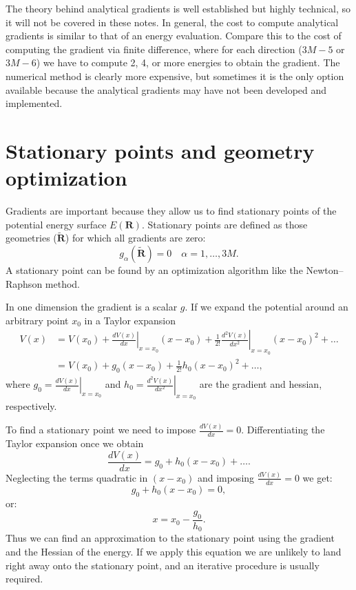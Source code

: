 \documentclass[../Main/chem532-notes.tex]{subfiles}
\begin{document}
The theory behind analytical gradients is well established but highly technical, so it will not be covered in these notes. In general, the cost to compute analytical gradients is similar to that of an energy evaluation. Compare this to the cost of computing the gradient via finite difference, where for each direction ($3M-5$ or $3M-6$) we have to compute 2, 4, or more energies to obtain the gradient.
The numerical method is clearly more expensive, but sometimes it is the only option available because the analytical gradients may have not been developed and implemented.

\section{Stationary points and geometry optimization}
Gradients are important because they allow us to find stationary points of the potential energy surface $E(\mathbf{R})$.
Stationary points are defined as those geometries ($\tilde{\mathbf{R}}$) for which all gradients are zero:
\begin{equation}
g_\alpha(\tilde{\mathbf{R}}) = 0 \quad \alpha = 1,\ldots,3M.
\end{equation}
A stationary point can be found by an optimization algorithm like the Newton--Raphson method. 

\begin{example}
In one dimension the gradient is a scalar $g$.
If we expand the potential around an arbitrary point $x_0$ in a Taylor expansion
\begin{equation}
\begin{split}
V(x) &= V(x_0) + \left.\frac{dV(x)}{dx}\right|_{x = x_0} (x - x_0)
+ \frac{1}{2!} \left.\frac{d^2V(x)}{dx^2}\right|_{x = x_0} (x - x_0)^2 + \ldots \\
&= V(x_0) + g_0 (x - x_0)
+ \frac{1}{2!} h_0 (x - x_0)^2 + \ldots,
\end{split}
\end{equation}
where $g_0 = \left.\frac{dV(x)}{dx}\right|_{x = x_0}$ and $h_0 = \left.\frac{d^2V(x)}{dx^2}\right|_{x = x_0}$ are the gradient and hessian, respectively.

To find a stationary point we need to impose $\frac{dV(x)}{dx} = 0$. Differentiating the Taylor expansion once we obtain
\begin{equation}
\frac{dV(x)}{dx} = g_0 + h_0 (x - x_0) + \ldots.
\end{equation}
Neglecting the terms quadratic in $(x - x_0)$ and imposing $\frac{dV(x)}{dx} = 0$ we get:
\begin{equation}
g_0 + h_0 (x - x_0) = 0,
\end{equation}
or:
\begin{equation}
x = x_0 - \frac{g_0}{h_0}.
\end{equation}
Thus we can find an approximation to the stationary point using the gradient and the Hessian of the energy.
If we apply this equation we are unlikely to land right away onto the stationary point, and an iterative procedure is usually required.
\end{example}
\end{document}
